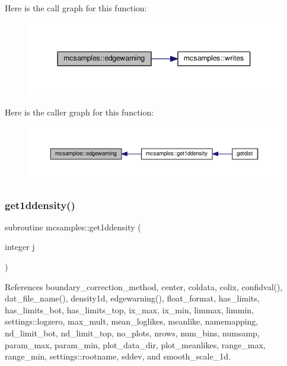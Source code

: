 Here is the call graph for this function\+:
\nopagebreak
\begin{figure}[H]
\begin{center}
\leavevmode
\includegraphics[width=344pt]{namespacemcsamples_a083f4a491dcb1c55ed0f61c0e4f435b1_cgraph}
\end{center}
\end{figure}
Here is the caller graph for this function\+:
\nopagebreak
\begin{figure}[H]
\begin{center}
\leavevmode
\includegraphics[width=350pt]{namespacemcsamples_a083f4a491dcb1c55ed0f61c0e4f435b1_icgraph}
\end{center}
\end{figure}
\mbox{\label{namespacemcsamples_a9bbfd241a96107124f0af5ef8d0fbe61}} 
\subsubsection{\texorpdfstring{get1ddensity()}{get1ddensity()}}
{\footnotesize\ttfamily subroutine mcsamples\+::get1ddensity (\begin{DoxyParamCaption}\item[{integer}]{j }\end{DoxyParamCaption})}



References boundary\+\_\+correction\+\_\+method, center, coldata, colix, confidval(), dat\+\_\+file\+\_\+name(), density1d, edgewarning(), float\+\_\+format, has\+\_\+limits, has\+\_\+limits\+\_\+bot, has\+\_\+limits\+\_\+top, ix\+\_\+max, ix\+\_\+min, limmax, limmin, settings\+::logzero, max\+\_\+mult, mean\+\_\+loglikes, meanlike, namemapping, nd\+\_\+limit\+\_\+bot, nd\+\_\+limit\+\_\+top, no\+\_\+plots, nrows, num\+\_\+bins, numsamp, param\+\_\+max, param\+\_\+min, plot\+\_\+data\+\_\+dir, plot\+\_\+meanlikes, range\+\_\+max, range\+\_\+min, settings\+::rootname, sddev, and smooth\+\_\+scale\+\_\+1d.



